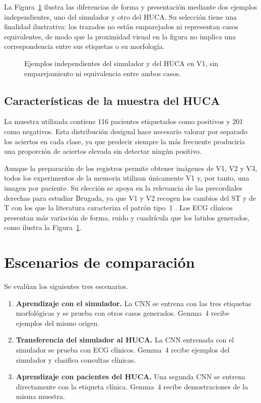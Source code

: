 La Figura~\ref{fig:synthetic_real_comparison} ilustra las diferencias de forma y presentación mediante dos ejemplos independientes, uno del simulador y otro del HUCA. Su selección tiene una finalidad ilustrativa: los trazados no están emparejados ni representan casos equivalentes, de modo que la proximidad visual en la figura no implica una correspondencia entre sus etiquetas o su morfología.

\begin{figure}[H]
  \centering
  \caption{Ejemplos independientes del simulador y del HUCA en V1, sin emparejamiento ni equivalencia entre ambos casos.}
  \label{fig:synthetic_real_comparison}
\end{figure}

\subsection{Características de la muestra del HUCA}
\label{sec:procedencia_huca}

La muestra utilizada contiene 116 pacientes etiquetados como positivos y 201 como negativos. Esta distribución desigual hace necesario valorar por separado los aciertos en cada clase, ya que predecir siempre la más frecuente produciría una proporción de aciertos elevada sin detectar ningún positivo.

Aunque la preparación de los registros permite obtener imágenes de V1, V2 y V3, todos los experimentos de la memoria utilizan únicamente V1 y, por tanto, una imagen por paciente. Su elección se apoya en la relevancia de las precordiales derechas para estudiar Brugada, ya que V1 y V2 recogen los cambios del ST y de T con los que la literatura caracteriza el patrón tipo~1 \cite{zeppenfeld2022}. Los ECG clínicos presentan más variación de forma, ruido y cuadrícula que los latidos generados, como ilustra la Figura~\ref{fig:synthetic_real_comparison}.

\section{Escenarios de comparación}
\label{sec:escenarios}

Se evalúan los siguientes tres escenarios.

\begin{enumerate}
  \item \textbf{Aprendizaje con el simulador.} La CNN se entrena con las tres etiquetas morfológicas y se prueba con otros casos generados. Gemma~4 recibe ejemplos del mismo origen.
  \item \begin{samepage}
  \textbf{Transferencia del simulador al HUCA.} La CNN entrenada con el simulador se prueba con ECG clínicos. Gemma~4 recibe ejemplos del simulador y clasifica consultas clínicas.
  \par
  \end{samepage}
  \item \textbf{Aprendizaje con pacientes del HUCA.} Una segunda CNN se entrena directamente con la etiqueta clínica. Gemma~4 recibe demostraciones de la misma muestra.
\end{enumerate}

